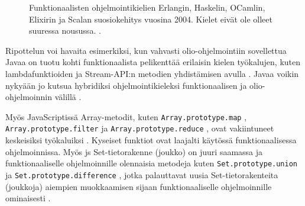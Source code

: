 \begin{figure}[htbp]
    \datatable
    \pgfplotstablegetrowsof{\datatable}
    \centering
    \caption{Funktionaalisten ohjelmointikielien Erlangin, Haskelin, OCamlin, Elixirin ja Scalan suosiokehitys vuosina 2004. Kielet eivät ole olleet suuressa nousussa. \cite{fplanggoogletrend}.}
    \label{fig:fplangpopularity}
\end{figure}


Ripottelun voi havaita esimerkiksi, kun vahvasti olio-ohjelmointiin sovellettua Javaa on tuotu kohti funktionaalista pelikenttää erilaisin kielen työkalujen, kuten lambdafunktioiden ja Stream-API:n metodien yhdistämisen avulla \cite{oracle_function_package,oracle_stream_api}.
Javaa voikin nykyään jo kutsua hybridiksi ohjelmointikieleksi funktionaalisen ja olio-ohjelmoinnin välillä \cite[50]{sundstrom_java_fp}.

Myös JavaScriptissä Array-metodit, kuten \texttt{Array.prototype.map} \cite{mdn_array_map}, \texttt{Array.prototype.filter} \cite{mdn_array_filter} ja \texttt{Array.prototype.reduce} \cite{mdn_array_reduce}, ovat vakiintuneet keskeisiksi työkaluiksi \cite{vakil2016,8_must_know_array_methods}. Kyseiset funktiot ovat laajalti käytössä funktionaalisessa ohjelmoinnissa. Myös \gls{js} Set-tietorakenne (joukko) on juuri saamassa  ja funktionaaliselle ohjelmoinnille olennaisia metodeja kuten \texttt{Set.prototype.union} \cite{mdn_set_union} ja \texttt{Set.prototype.difference} \cite{mdn_set_intersection}, jotka palauttavat uusia Set-tietorakenteita (joukkoja) aiempien muokkaamisen sijaan funktionaaliselle ohjelmoinnille ominaisesti \cite{mdn_set_methods}.

